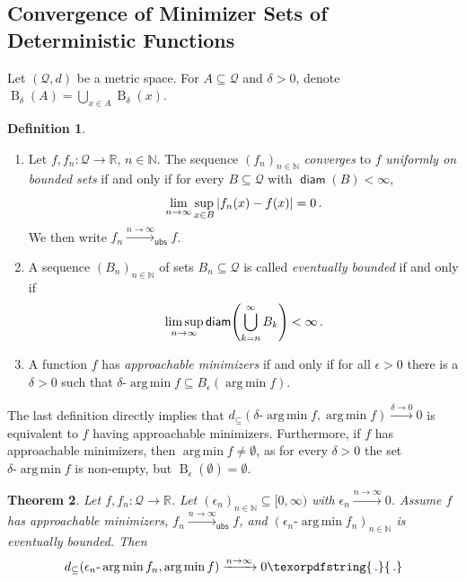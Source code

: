 \documentclass{scrartcl}
\renewcommand{\subset}{\subseteq}
\DeclareMathOperator{\diam}{\mathsf{diam}}
\DeclareMathOperator{\ball}{\mathrm{B}}
\newcommand*{\mc}[1]{\mathcal{#1}}
\newcommand{\N}{\mathbb{N}}
\newcommand{\R}{\mathbb{R}}
\newcommand{\equationFullstop}{\, .}
\newcommand{\eqfs}{\equationFullstop}
\DeclareMathOperator*{\argmin}{arg\,min}
\def\MS{\mathcal{Q}}\def\epi{\mathsf{epi}}\def\aec{\mathsf{aec}}\def\alsec{\mathsf{alsec}}\def\aecp{\mathsf{aec}_P}\def\Hausdorff{\mathsf{H}}\def\Haus{\mathsf{H}}\def\ubs{\mathsf{ubs}}\newcommand{\epiconv}[1]{\xrightarrow{#1\to\infty}_\epi}\newcommand{\hausconv}[1]{\xrightarrow{#1\to\infty}_\Hausdorff}\newcommand{\ubsconv}[1]{\xrightarrow{#1\to\infty}_\ubs}\newcommand{\ol}[2]{\overline{#1,\!#2}}
\theoremstyle{plain}\newtheorem{theorem}{Theorem}[section]
\theoremstyle{definition}
\newtheorem{definition}[theorem]{Definition}
\theoremstyle{remark}
\providecommand{\DIFaddtex}[1]{{\protect\color{blue}\uwave{#1}}} %
\providecommand{\DIFaddbegin}{} %
\providecommand{\DIFaddend}{} %
\providecommand{\DIFadd}[1]{\texorpdfstring{\DIFaddtex{#1}}{#1}} %
\newcommand{\DIFaddincludegraphics}[2][]{{\color{blue}\fbox{\DIFOincludegraphics[#1]{#2}}}} %
\DeclareRobustCommand{\DIFaddbegin}{\DIFOaddbegin \let\includegraphics\DIFaddincludegraphics} %
\DeclareRobustCommand{\DIFaddend}{\DIFOaddend \let\includegraphics\DIFOincludegraphics} %
\begin{document}
\begin{appendix}
\subsection{Convergence of Minimizer Sets of Deterministic Functions}\label{ssec:alt:det}
Let $(\mc Q, d)$ be a metric space. For $A\subset \mc Q$ and $\delta>0$, denote $\ball_\delta(A) = \bigcup_{x\in A} \ball_\delta(x)$. 
\begin{definition} \mbox{ }
	\begin{enumerate}[label=(\roman*)]
	\item 
		Let $f,f_n \colon \MS\to\R$, $n\in\N$.
		The sequence $(f_n)_{n\in\N}$  \emph{converges} to $f$ \emph{uniformly on bounded sets} if and only if for every $B\subset \MS$ with $\diam(B)<\infty$,
		\begin{equation*}
		\lim_{n\to\infty} \sup_{x\in B}\abs{f_n(x) - f(x)} =0
		\eqfs
		\end{equation*}
		We then write $f_n\ubsconv{n}f$.
	\item 
		A sequence $(B_n)_{n\in\N}$ of sets $B_n \subset \MS$ is called \emph{eventually bounded} if and only if
		\begin{equation*}
		\limsup_{n\to\infty} \diam\brOf{\bigcup_{k=n}^\infty B_k} < \infty
		\eqfs
		\end{equation*}
	\item 
		A function $f$ has \emph{approachable minimizers} if and only if for all $\epsilon >0$ there is a $\delta>0$ such that
		$\delta\text{-}\argmin f \subset B_\epsilon(\argmin f)$.
	\end{enumerate}	
\end{definition}
The last definition directly implies that $d_\subset(\delta\text{-}\argmin f, \argmin f) \xrightarrow{\delta\to0} 0$ is equivalent to $f$ having approachable minimizers. Furthermore, if $f$ has approachable minimizers, then $\argmin f \neq \emptyset$, as for every $\delta>0$ the set $\delta\text{-}\argmin f$ is non-empty, but $\ball_\epsilon(\emptyset)=\emptyset$.
\begin{theorem}\label{thm:alt:convOfMini}
	Let $f,f_n \colon \MS\to\R$. Let $(\epsilon_n)_{n\in\N}\subset [0,\infty)$ with $\epsilon_n \xrightarrow{n\to\infty}0$. 
	Assume $f$ has approachable minimizers, $f_n \xrightarrow{n\to\infty}_{\ubs} f$, and $(\epsilon_n\text{-}\argmin f_n)_{n\in\N}$ is eventually bounded.
	Then
	\begin{equation*}
		d_\subset(\epsilon_n\text{-}\argmin f_n, \argmin f)\xrightarrow{n\to\infty}
		0
		\DIFaddbegin \DIFadd{\eqfs
	}\DIFaddend \end{equation*}

\end{theorem}
\end{appendix}
\end{document}
